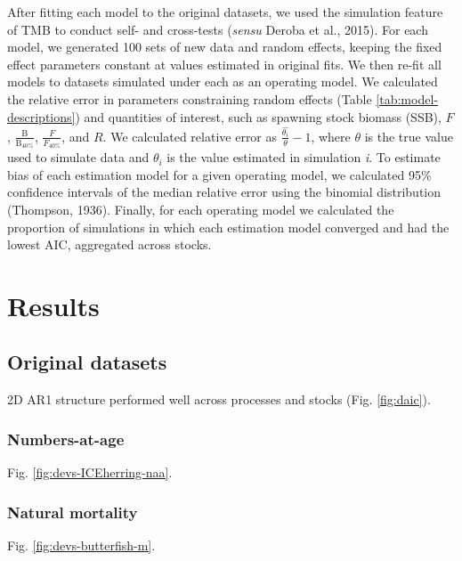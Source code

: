 \documentclass[]{article}
\begin{document}
After fitting each model to the original datasets, we used the
simulation feature of TMB to conduct self- and cross-tests (\emph{sensu}
Deroba et al., 2015). For each model, we generated 100 sets of new data
and random effects, keeping the fixed effect parameters constant at
values estimated in original fits. We then re-fit all models to datasets
simulated under each as an operating model. We calculated the relative
error in parameters constraining random effects (Table
\ref{tab:model-descriptions}) and quantities of interest, such as
spawning stock biomass (SSB), \(F\),
\(\frac{\text{B}}{\text{B}_{40\%}}\), \(\frac{F}{F_{40\%}}\), and \(R\).
We calculated relative error as \(\frac{\hat{\theta_i}}{\theta}-1\),
where \(\theta\) is the true value used to simulate data and
\(\theta_i\) is the value estimated in simulation \emph{i}. To estimate
bias of each estimation model for a given operating model, we calculated
95\% confidence intervals of the median relative error using the
binomial distribution (Thompson, 1936). Finally, for each operating
model we calculated the proportion of simulations in which each
estimation model converged and had the lowest AIC, aggregated across
stocks.

\hypertarget{results}{%
\section{Results}\label{results}}

\hypertarget{original-datasets}{%
\subsection{Original datasets}\label{original-datasets}}

2D AR1 structure performed well across processes and stocks (Fig.
\ref{fig:daic}).

\hypertarget{numbers-at-age}{%
\subsubsection{Numbers-at-age}\label{numbers-at-age}}

Fig. \ref{fig:devs-ICEherring-naa}.

\hypertarget{natural-mortality}{%
\subsubsection{Natural mortality}\label{natural-mortality}}

Fig. \ref{fig:devs-butterfish-m}.
\end{document}
